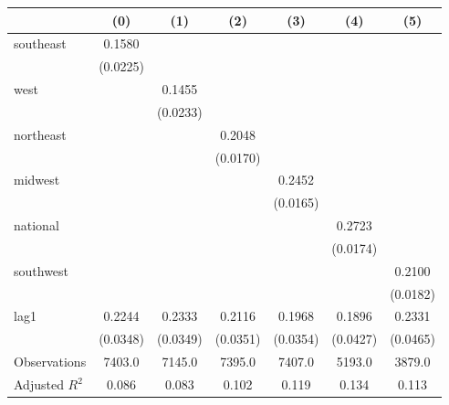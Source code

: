 \begin{tabular}{lcccccc}
\toprule
 & (0) & (1) & (2) & (3) & (4) & (5) \\
\midrule
southeast & 0.1580 &  &  &  &  &  \\
\vspace{0.2cm}
 & (0.0225) &  &  &  &  &  \\
west &  & 0.1455 &  &  &  &  \\
\vspace{0.2cm}
 &  & (0.0233) &  &  &  &  \\
northeast &  &  & 0.2048 &  &  &  \\
\vspace{0.2cm}
 &  &  & (0.0170) &  &  &  \\
midwest &  &  &  & 0.2452 &  &  \\
\vspace{0.2cm}
 &  &  &  & (0.0165) &  &  \\
national &  &  &  &  & 0.2723 &  \\
\vspace{0.2cm}
 &  &  &  &  & (0.0174) &  \\
southwest &  &  &  &  &  & 0.2100 \\
\vspace{0.2cm}
 &  &  &  &  &  & (0.0182) \\
lag1 & 0.2244 & 0.2333 & 0.2116 & 0.1968 & 0.1896 & 0.2331 \\
\vspace{0.2cm}
 & (0.0348) & (0.0349) & (0.0351) & (0.0354) & (0.0427) & (0.0465) \\
\midrule
Observations & 7403.0 & 7145.0 & 7395.0 & 7407.0 & 5193.0 & 3879.0 \\
Adjusted $R^2$ & 0.086 & 0.083 & 0.102 & 0.119 & 0.134 & 0.113 \\
\bottomrule
\end{tabular}